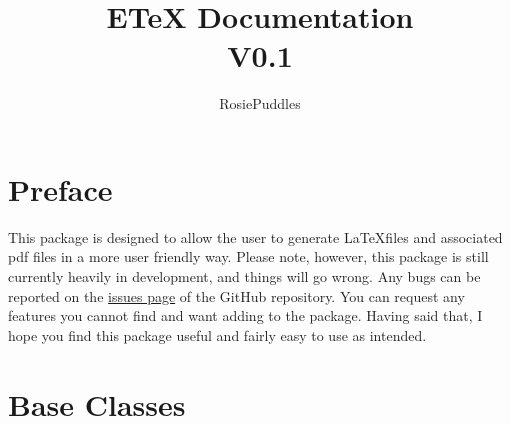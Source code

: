 \documentclass{article}
\title{ETeX Documentation\\\large V0.1}
\date{}
\author{RosiePuddles}
\begin{document}
\maketitle
\tableofcontents
\newpage
\section[Preface]{Preface}
This package is designed to allow the user to generate \LaTeX  files and associated pdf files in a more user friendly way. Please note, however, this package is still currently heavily in development, and things will go wrong. Any bugs can be reported on the \href{https:/github.comRosiePuddlesETeX_from_pythonissues}{issues page} of the GitHub repository. You can request any features you cannot find and want adding to the package. Having said that, I hope you find this package useful and fairly easy to use as intended.\section[Base Classes]{Base Classes}
\end{document}
